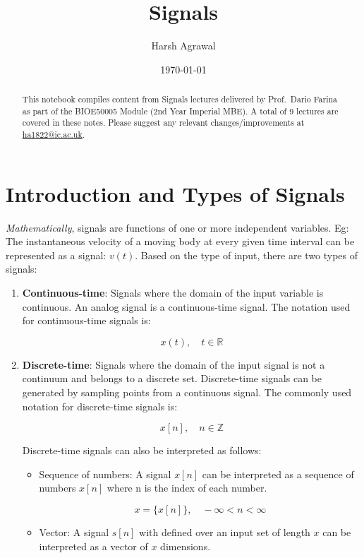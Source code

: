 \documentclass[letterpaper,12pt]{article}
\begin{document}
\title{Signals}
\author{Harsh Agrawal}
\date{\today}
\maketitle

\begin{abstract}
    This notebook compiles content from Signals lectures delivered by Prof.\ Dario Farina as part of the BIOE50005 Module (2nd Year Imperial MBE). A total of 9 lectures are covered in these notes. Please suggest any relevant changes/improvements at \href{ha1822@ic.ac.uk}{ha1822@ic.ac.uk}.
\end{abstract}

\tableofcontents
\newpage

\section{Introduction and Types of Signals}

\textit{Mathematically}, signals are functions of one or more independent variables. Eg: The instantaneous velocity of a moving body at every given time interval can be represented as a signal: \(v(t)\). Based on the type of input, there are two types of signals:
\begin{enumerate}
    \item \textbf{Continuous-time}: Signals where the domain of the input variable is continuous. An analog signal is a continuous-time signal. The notation used for continuous-time signals is:

          \[x(t), \quad t \in \mathbb{R}\]

    \item \textbf{Discrete-time}: Signals where the domain of the input signal is not a continuum and belongs to a discrete set. Discrete-time signals can be generated by sampling points from a continuous signal. The commonly used notation for discrete-time signals is:

          \[x[n], \quad n \in \mathbb{Z}\]

          Discrete-time signals can also be interpreted as follows:
          \begin{itemize}
              \item Sequence of numbers: A signal $x[n]$ can be interpreted as a sequence of
                    numbers $x[n]$ where n is the index of each number.

                    \[x = \{x[n]\}, \quad -\infty < n < \infty\]

              \item Vector: A signal $s[n]$ with defined over an input set of length $x$ can be
                    interpreted as a vector of $x$ dimensions.

          \end{itemize}

\end{enumerate}
\end{document}
